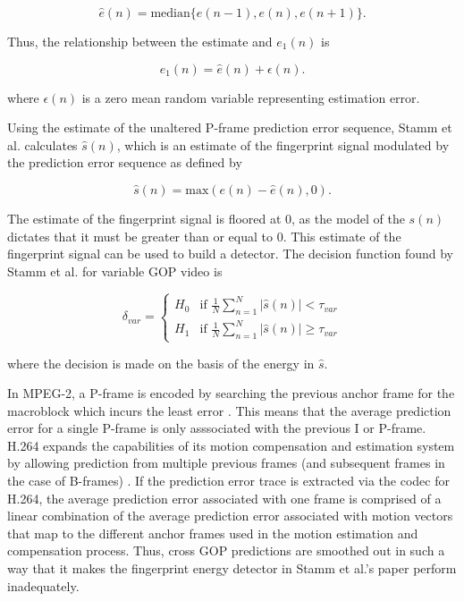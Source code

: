 \begin{equation}
\hat{e}(n) = \text{median}\{ e(n-1), e(n), e(n+1) \}.
\end{equation}

Thus, the relationship between the estimate and $e_{1}(n)$ is

\begin{equation}
e_{1}(n) = \hat{e}(n) + \epsilon(n).
\end{equation}

where $\epsilon(n)$ is a zero mean random variable representing estimation error.

Using the estimate of the unaltered P-frame prediction error sequence, Stamm et al. calculates $\hat{s}(n)$, which is an estimate of the fingerprint signal modulated by the prediction error sequence as defined by

\begin{equation}
\hat{s}(n) = \text{max}(e(n) - \hat{e}(n), 0).
\label{estfpsig}
\end{equation}

The estimate of the fingerprint signal is floored at 0, as the model of the $s(n)$ dictates that it must be greater than or equal to 0. This estimate of the fingerprint signal can be used to build a detector. The decision function found by Stamm et al. for variable GOP video is

\begin{equation}
\delta_{var} =
\begin{cases}
  H_{0} & \text{if } \frac{1}{N} \sum_{n=1}^{N} \vert \hat{s}(n) \vert < \tau_{var} \\
  H_{1} & \text{if } \frac{1}{N} \sum_{n=1}^{N} \vert \hat{s}(n) \vert \geq \tau_{var}
\end{cases}
\label{origdecision}
\end{equation}

where the decision is made on the basis of the energy in $\hat{s}$.

In MPEG-2, a P-frame is encoded by searching the previous anchor frame for the macroblock which incurs the least error \cite{mpeg2}. This means that the average prediction error for a single P-frame is only asssociated with the previous I or P-frame. H.264 expands the capabilities of its motion compensation and estimation system by allowing prediction from multiple previous frames (and subsequent frames in the case of B-frames) \cite{h264}. If the prediction error trace is extracted via the codec for H.264, the average prediction error associated with one frame is comprised of a linear combination of the average prediction error associated with motion vectors that map to the different anchor frames used in the motion estimation and compensation process. Thus, cross GOP predictions are smoothed out in such a way that it makes the fingerprint energy detector in Stamm et al.'s paper perform inadequately.

